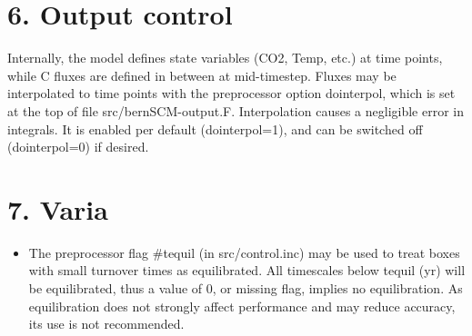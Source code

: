 \documentclass[11pt]{article}
\begin{document}
\section*{6. Output control}
\label{sec-7}

Internally, the model defines state variables (CO2, Temp, etc.) at time points, while C fluxes are defined in between at mid-timestep.
Fluxes may be interpolated to time points with the preprocessor option dointerpol, which is set at the top of file src/bernSCM-output.F. Interpolation causes a negligible error in integrals. It is enabled per default (dointerpol=1), and can be switched off (dointerpol=0) if desired. 


\section*{7. Varia}
\label{sec-8}

\begin{itemize}
\item The preprocessor flag \#tequil (in src/control.inc) may be used to treat boxes with small turnover times as equilibrated. All timescales below tequil (yr) will be equilibrated, thus a value of 0, or missing flag, implies no equilibration. As equilibration does not strongly affect performance and may reduce accuracy, its use is not recommended.
\end{itemize}
\end{document}
